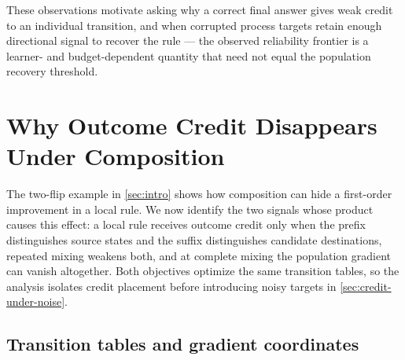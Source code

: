 These observations motivate asking why a correct final answer gives weak
credit to an individual transition, and when corrupted process targets
retain enough directional signal to recover the rule --- the observed
reliability frontier is a learner- and budget-dependent quantity that
need not equal the population recovery threshold.

\section{Why Outcome Credit Disappears Under Composition}
\label{sec:operator-credit}

The two-flip example in \cref{sec:intro} shows how composition can hide a
first-order improvement in a local rule. We now identify the two signals whose
product causes this effect: a local rule receives outcome credit only when
the prefix distinguishes source states and the suffix distinguishes candidate
destinations, repeated mixing weakens both, and at complete mixing the
population gradient can vanish altogether. Both objectives optimize the same
transition tables, so the analysis isolates credit placement before
introducing noisy targets in \cref{sec:credit-under-noise}.

\subsection{Transition tables and gradient coordinates}

